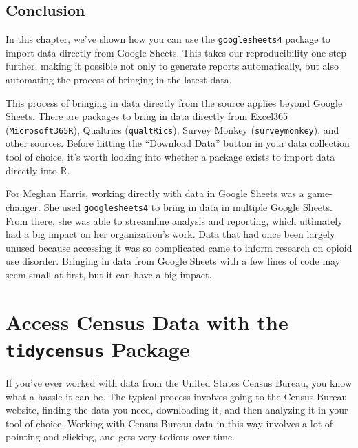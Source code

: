 \documentclass[
]{book}
\begin{document}
\hypertarget{conclusion-2}{%
\section*{Conclusion}\label{conclusion-2}}

In this chapter, we've shown how you can use the \texttt{googlesheets4} package to import data directly from Google Sheets. This takes our reproducibility one step further, making it possible not only to generate reports automatically, but also automating the process of bringing in the latest data.

This process of bringing in data directly from the source applies beyond Google Sheets. There are packages to bring in data directly from Excel365 (\texttt{Microsoft365R}), Qualtrics (\texttt{qualtRics}), Survey Monkey (\texttt{surveymonkey}), and other sources. Before hitting the ``Download Data'' button in your data collection tool of choice, it's worth looking into whether a package exists to import data directly into R.

For Meghan Harris, working directly with data in Google Sheets was a game-changer. She used \texttt{googlesheets4} to bring in data in multiple Google Sheets. From there, she was able to streamline analysis and reporting, which ultimately had a big impact on her organization's work. Data that had once been largely unused because accessing it was so complicated came to inform research on opioid use disorder. Bringing in data from Google Sheets with a few lines of code may seem small at first, but it can have a big impact.

\hypertarget{tidycensus-chapter}{%
\chapter{\texorpdfstring{Access Census Data with the \texttt{tidycensus} Package}{Access Census Data with the tidycensus Package}}\label{tidycensus-chapter}}

If you've ever worked with data from the United States Census Bureau, you know what a hassle it can be. The typical process involves going to the Census Bureau website, finding the data you need, downloading it, and then analyzing it in your tool of choice. Working with Census Bureau data in this way involves a lot of pointing and clicking, and gets very tedious over time.
\end{document}
